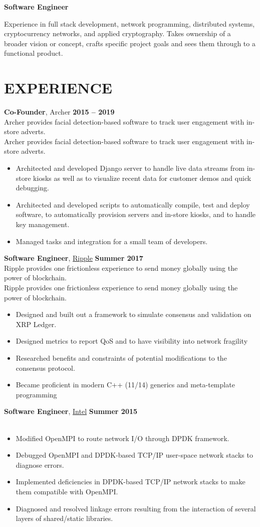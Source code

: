 \documentclass[10pt, center]{res} %
\newcommand{\pad}{\vspace{2pt}}
\newcommand{\unpad}{\vspace{-2pt}}
\newcommand{\bullets}[1]{
	\begin{itemize}[noitemsep]
		#1
	\end{itemize}
	\vspace{-6pt}
}
\newcommand{\experience}[5]{
	{\bf #1}, #2 \hfill {\bf #3} \\ \vspace{-10pt}
	\ifx\hfbuzz#4\hfbuzz
		\vspace{-4pt}
	\else
		{\vspace{-4pt} \\ #4}
	\fi
	\bullets{#5}
}
\begin{document}
\address{jmmcgee.00@gmail.com | (323) 557-8647}
\begin{resume}

\pad
\centerline{\textbf{\huge Software Engineer}}
\parbox{\textwidth}{
	Experience in full stack development, network programming, distributed systems, cryptocurrency networks, and applied cryptography. Takes ownership of a broader vision or concept, crafts specific project goals and sees them through to a functional product.
}

\unpad
\section{EXPERIENCE}
	\experience{Co-Founder}{Archer}{2015 -- 2019}{
	Archer provides facial detection-based software to track user engagement with in-store adverts.}{
		\item Architected and developed Django server to handle live data streams from in-store kiosks as well as to visualize recent data for customer demos and quick debugging.
		\item Architected and developed scripts to automatically compile, test and deploy software, to automatically provision servers and in-store kiosks, and to handle key management.
		\item Managed tasks and integration for a small team of developers.
	}

    \experience{Software Engineer}{\href{https://ripple.com/}{Ripple}}{Summer 2017}{
   	Ripple provides one frictionless experience to send money globally using the power of blockchain.}{
		\item Designed and built out a framework to simulate consensus and validation on XRP Ledger.
		\item Designed metrics to report QoS and  to have visibility into network fragility
		\item Researched benefits and constraints of potential modifications to the consensus protocol.
		\item Became proficient in modern C++ (11/14) generics and meta-template programming
    }

    \experience{Software Engineer}{\href{https://www.intel.com}{Intel}}{Summer 2015}{}{
		\item Modified OpenMPI to route network I/O through DPDK framework.
		\item Debugged OpenMPI and DPDK-based TCP/IP user-space network stacks to diagnose errors.
		\item Implemented deficiencies in DPDK-based TCP/IP network stacks to make them compatible with OpenMPI.
		\item Diagnosed and resolved linkage errors resulting from the interaction of several layers of shared/static libraries.
    }


\end{resume}
\end{document}
